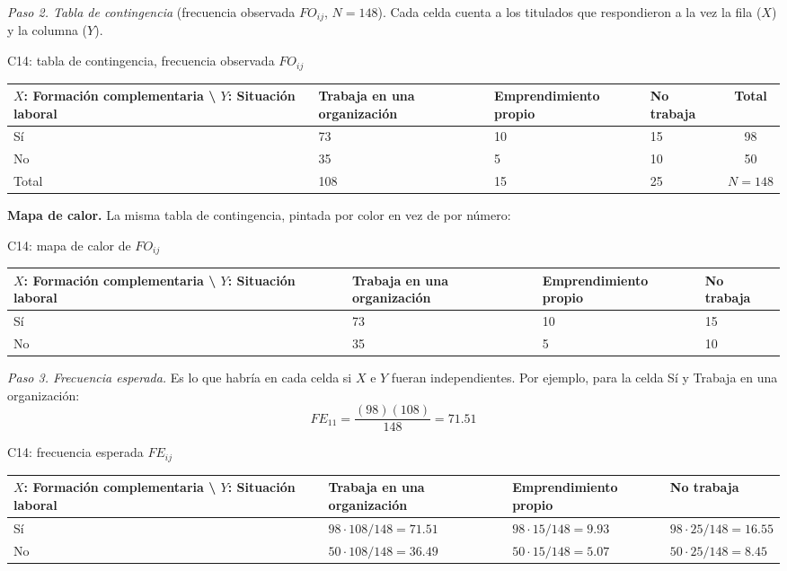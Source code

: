 \textit{Paso 2. Tabla de contingencia} (frecuencia observada $FO_{ij}$, $N = 148$). Cada celda cuenta a los titulados que respondieron a la vez la fila ($X$) y la columna ($Y$).

\begin{mitabla}{C14: tabla de contingencia, frecuencia observada $FO_{ij}$}
\begin{tabular}{L{3.8cm}C{3.00cm}C{3.00cm}C{3.00cm}|c}
\toprule
$X$: Formación complementaria \textbackslash{} $Y$: Situación laboral & Trabaja en una organización & Emprendimiento propio & No trabaja & Total \\
\midrule
Sí & 73 & 10 & 15 & 98 \\
No & 35 & 5 & 10 & 50 \\
\midrule
Total & 108 & 15 & 25 & $N = 148$ \\
\bottomrule
\end{tabular}
\end{mitabla}

\textbf{Mapa de calor.} La misma tabla de contingencia, pintada por color en vez de por número:

\begin{mitabla}{C14: mapa de calor de $FO_{ij}$}
\begin{tabular}{L{3.8cm}C{3.00cm}C{3.00cm}C{3.00cm}}
\toprule
$X$: Formación complementaria \textbackslash{} $Y$: Situación laboral & Trabaja en una organización & Emprendimiento propio & No trabaja \\
\midrule
Sí & 73 & 10 & 15 \\
No & 35 & 5 & 10 \\
\bottomrule
\end{tabular}
\end{mitabla}

\textit{Paso 3. Frecuencia esperada.} Es lo que habría en cada celda si $X$ e $Y$ fueran independientes. Por ejemplo, para la celda Sí y Trabaja en una organización:
\[
FE_{11} = \frac{(98)(108)}{148} = 71.51
\]

\begin{mitabla}{C14: frecuencia esperada $FE_{ij}$}
\begin{tabular}{L{3.8cm}C{3.00cm}C{3.00cm}C{3.00cm}}
\toprule
$X$: Formación complementaria \textbackslash{} $Y$: Situación laboral & Trabaja en una organización & Emprendimiento propio & No trabaja \\
\midrule
Sí & $98\cdot108/148 = 71.51$ & $98\cdot15/148 = 9.93$ & $98\cdot25/148 = 16.55$ \\
No & $50\cdot108/148 = 36.49$ & $50\cdot15/148 = 5.07$ & $50\cdot25/148 = 8.45$ \\
\bottomrule
\end{tabular}
\end{mitabla}

